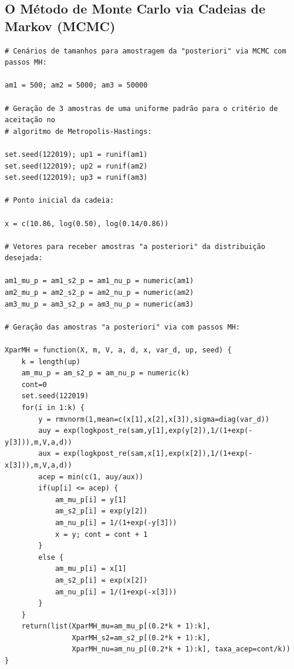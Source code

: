 \documentclass[12pt,reqno,a4paper,oneside]{article}
\begin{document}
\newpage

\subsection*{O Método de Monte Carlo via Cadeias de Markov (MCMC)}

\begin{verbatim}
# Cenários de tamanhos para amostragem da "posteriori" via MCMC com passos MH:

am1 = 500; am2 = 5000; am3 = 50000

# Geração de 3 amostras de uma uniforme padrão para o critério de aceitação no
# algoritmo de Metropolis-Hastings:

set.seed(122019); up1 = runif(am1)
set.seed(122019); up2 = runif(am2)
set.seed(122019); up3 = runif(am3)

# Ponto inicial da cadeia:

x = c(10.86, log(0.50), log(0.14/0.86))

# Vetores para receber amostras "a posteriori" da distribuição desejada:

am1_mu_p = am1_s2_p = am1_nu_p = numeric(am1)
am2_mu_p = am2_s2_p = am2_nu_p = numeric(am2)
am3_mu_p = am3_s2_p = am3_nu_p = numeric(am3)

# Geração das amostras "a posteriori" via com passos MH:

XparMH = function(X, m, V, a, d, x, var_d, up, seed) {
	k = length(up)
	am_mu_p = am_s2_p = am_nu_p = numeric(k)
	cont=0
	set.seed(122019)
	for(i in 1:k) {
		y = rmvnorm(1,mean=c(x[1],x[2],x[3]),sigma=diag(var_d))
		auy = exp(logkpost_re(sam,y[1],exp(y[2]),1/(1+exp(-y[3])),m,V,a,d))
		aux = exp(logkpost_re(sam,x[1],exp(x[2]),1/(1+exp(-x[3])),m,V,a,d))
		acep = min(c(1, auy/aux))
		if(up[i] <= acep) {
			am_mu_p[i] = y[1]
			am_s2_p[i] = exp(y[2])
			am_nu_p[i] = 1/(1+exp(-y[3]))
			x = y; cont = cont + 1
		}
		else {
			am_mu_p[i] = x[1]
			am_s2_p[i] = exp(x[2])
			am_nu_p[i] = 1/(1+exp(-x[3]))
		}
	}
	return(list(XparMH_mu=am_mu_p[(0.2*k + 1):k],
				XparMH_s2=am_s2_p[(0.2*k + 1):k],
				XparMH_nu=am_nu_p[(0.2*k + 1):k], taxa_acep=cont/k))
}
\end{verbatim}
\end{document}
